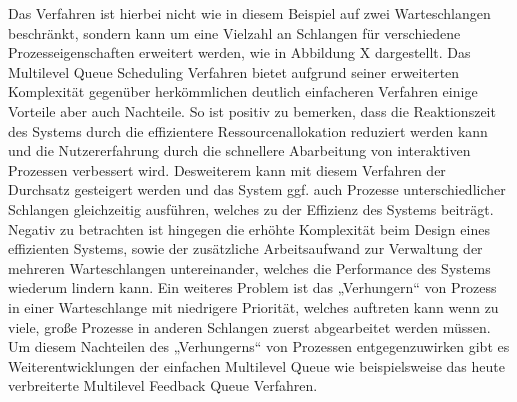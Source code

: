 Das Verfahren ist hierbei nicht wie in diesem Beispiel auf zwei Warteschlangen beschränkt, sondern kann um eine Vielzahl an Schlangen für verschiedene Prozesseigenschaften erweitert werden, wie in Abbildung X dargestellt.
Das Multilevel Queue Scheduling Verfahren bietet aufgrund seiner erweiterten Komplexität gegenüber herkömmlichen deutlich einfacheren Verfahren einige Vorteile aber auch Nachteile. So ist positiv zu bemerken, dass die Reaktionszeit des Systems durch die effizientere Ressourcenallokation reduziert werden kann und die Nutzererfahrung durch die schnellere Abarbeitung von interaktiven Prozessen verbessert wird. Desweiterem kann mit diesem Verfahren der Durchsatz gesteigert werden und das System ggf. auch Prozesse unterschiedlicher Schlangen gleichzeitig ausführen, welches zu der Effizienz des Systems beiträgt. Negativ zu betrachten ist hingegen die erhöhte Komplexität beim Design eines effizienten Systems, sowie der zusätzliche Arbeitsaufwand zur Verwaltung der mehreren Warteschlangen untereinander, welches die Performance des Systems wiederum lindern kann. Ein weiteres Problem ist das „Verhungern“ von Prozess in einer Warteschlange mit niedrigere Priorität, welches auftreten kann wenn zu viele, große Prozesse in anderen Schlangen zuerst abgearbeitet werden müssen.
Um diesem Nachteilen des „Verhungerns“ von Prozessen entgegenzuwirken gibt es Weiterentwicklungen der einfachen Multilevel Queue wie beispielsweise das heute verbreiterte Multilevel Feedback Queue Verfahren.




